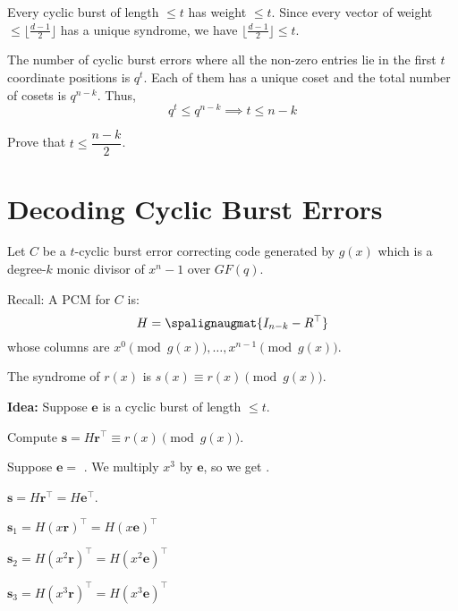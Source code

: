\begin{Proof}{}{}
    Every cyclic burst of length $ \leqslant t $ has weight $ \leqslant t $.
    Since every vector of weight $ \leqslant \lfloor \frac{d-1}{2} \rfloor $
    has a unique syndrome, we have $ \lfloor \frac{d-1}{2} \rfloor \leqslant t $.

    The number of cyclic burst errors where all the non-zero entries lie in the first
    $ t $ coordinate positions is $ q^t $. Each of them has a unique coset
    and the total number of cosets is $ q^{n-k} $. Thus,
    \[ q^t\leqslant q^{n-k}\implies t\leqslant n-k \]
\end{Proof}

\begin{Exercise}{}{}
    Prove that $ t\leqslant \dfrac{n-k}{2} $.
\end{Exercise}

\section{Decoding Cyclic Burst Errors}
Let $ C $ be a $ t $-cyclic burst error correcting code generated
by $ g(x) $ which is a degree-$ k $ monic divisor of $ x^n-1 $ over $ GF(q) $.

Recall: A PCM for $ C $ is:
\[ H= \spalignaugmat{I_{n-k} -R^\top} \]
whose columns are $ x^0 \pmod{g(x)},\ldots ,x^{n-1} \pmod{g(x)} $.

The syndrome of $ r(x) $ is $ s(x)\equiv r(x)\pmod{g(x)} $.

\textbf{Idea:} Suppose $ \symbf{e} $ is a cyclic burst of length $ \leqslant t $.

Compute $ \symbf{s}=H\symbf{r}^\top\equiv r(x)\pmod{g(x)} $.

Suppose $ \symbf{e}= $ . We multiply $ x^3 $ by $ \symbf{e} $,
so we get .

$ \symbf{s}=H\symbf{r}^\top=H\symbf{e}^\top $.

$ \symbf{s}_1=H(x\symbf{r})^\top = H(x\symbf{e})^\top $

$ \symbf{s}_2=H(x^2\symbf{r})^\top = H(x^2\symbf{e})^\top $

$ \symbf{s}_3=H(x^3\symbf{r})^\top = H(x^3\symbf{e})^\top $
